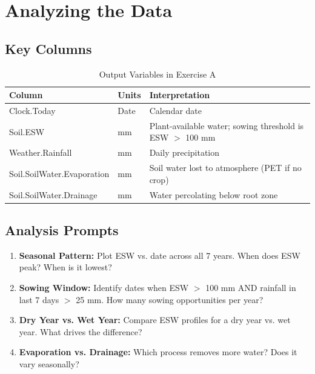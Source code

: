 \section{Analyzing the Data}

\subsection{Key Columns}

\begin{table}[H]
\centering
\caption{Output Variables in Exercise A}
\label{tab:exercise-a-vars}
\begin{tabularx}{\textwidth}{l|X|X}
\toprule
\textbf{Column} & \textbf{Units} & \textbf{Interpretation} \\
\midrule
Clock.Today & Date & Calendar date \\
Soil.ESW & mm & Plant-available water; sowing threshold is ESW $>$ 100 mm \\
Weather.Rainfall & mm & Daily precipitation \\
Soil.SoilWater.Evaporation & mm & Soil water lost to atmosphere (PET if no crop) \\
Soil.SoilWater.Drainage & mm & Water percolating below root zone \\
\bottomrule
\end{tabularx}
\end{table}

\subsection{Analysis Prompts}

\begin{enumerate}
  \item \textbf{Seasonal Pattern:} Plot ESW vs. date across all 7 years. When does ESW peak? When is it lowest?
  
  \item \textbf{Sowing Window:} Identify dates when ESW $>$ 100 mm AND rainfall in last 7 days $>$ 25 mm. How many sowing opportunities per year?
  
  \item \textbf{Dry Year vs. Wet Year:} Compare ESW profiles for a dry year vs. wet year. What drives the difference?
  
  \item \textbf{Evaporation vs. Drainage:} Which process removes more water? Does it vary seasonally?
\end{enumerate}

